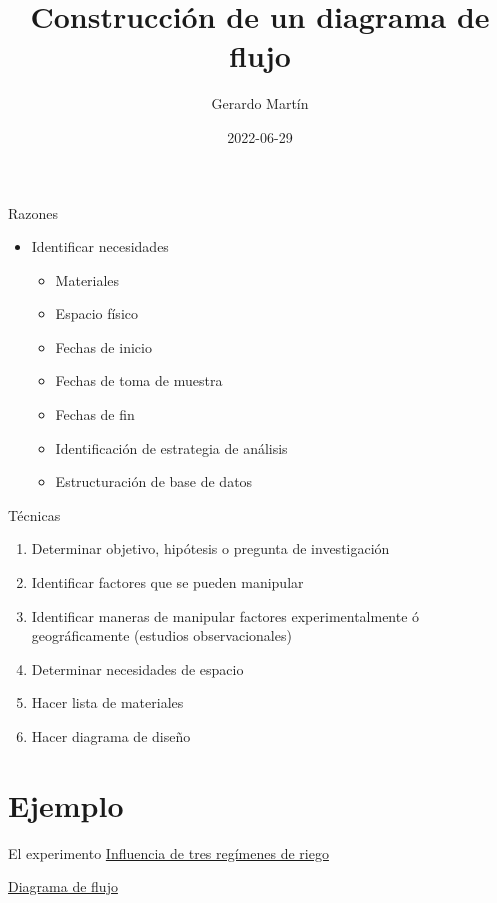\documentclass[
  11pt,
  ignorenonframetext,
]{beamer}
\title{Construcción de un diagrama de flujo}
\author{Gerardo Martín}
\date{2022-06-29}
\providecommand{\tightlist}{%
  \setlength{\itemsep}{0pt}\setlength{\parskip}{0pt}}
\begin{document}
\frame{\titlepage}

\begin{frame}{Razones}
\protect\hypertarget{razones}{}
\begin{itemize}
\item
  Identificar necesidades

  \begin{itemize}
  \tightlist
  \item
    Materiales
  \item
    Espacio físico
  \item
    Fechas de inicio
  \item
    Fechas de toma de muestra
  \item
    Fechas de fin
  \item
    Identificación de estrategia de análisis
  \item
    Estructuración de base de datos
  \end{itemize}
\end{itemize}
\end{frame}

\begin{frame}{Técnicas}
\protect\hypertarget{tuxe9cnicas}{}
\begin{enumerate}
\tightlist
\item
  Determinar objetivo, hipótesis o pregunta de investigación
\item
  Identificar factores que se pueden manipular
\item
  Identificar maneras de manipular factores experimentalmente ó
  geográficamente (estudios observacionales)
\item
  Determinar necesidades de espacio
\item
  Hacer lista de materiales
\item
  Hacer diagrama de diseño
\end{enumerate}
\end{frame}

\hypertarget{ejemplo}{%
\section{Ejemplo}\label{ejemplo}}

\begin{frame}{El experimento}
\protect\hypertarget{el-experimento}{}
\href{https://www.scielo.org.mx/scielo.php?script=sci_arttext\&pid=S0187-57792022000100110\&lang=es}{Influencia
de tres regímenes de riego}

\href{Figuras-disenos/diagrama.odg}{Diagrama de flujo}
\end{frame}
\end{document}
